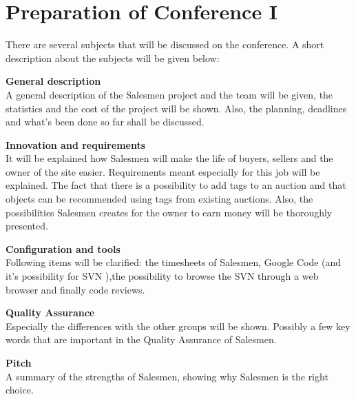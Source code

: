 \documentclass[a4paper, 12pt]{article}
\begin{document}
	\section{Preparation of Conference I}
There are several subjects that will be discussed on the conference. A short description about the subjects will be given below:
		\begin{description}
			\item \textbf{General description} \\
A general description of the Salesmen project and the team will be given, the statistics and the cost of the project will be shown. Also, the planning, deadlines and what's been done so far shall be discussed.
			\item \textbf{Innovation and requirements} \\
It will be explained how Salesmen will make the life of buyers, sellers and the owner of the site easier. Requirements meant especially for this job will be explained. The fact that there is a possibility to add tags to an auction and that objects can be recommended using tags from existing auctions. Also, the possibilities Salesmen creates for the owner to earn money will be thoroughly presented. 
			\item \textbf{Configuration and tools} \\
Following items will be clarified: the timesheets of Salesmen, Google Code (and it's possibility for SVN ),the possibility to browse the SVN through a web browser and finally code reviews.
			\item \textbf{Quality Assurance} \\
Especially the differences with the other groups will be shown. Possibly a few key words that are important in the Quality Assurance of Salesmen.
			\item \textbf{Pitch} \\
A summary of the strengths of Salesmen, showing why Salesmen is the right choice.
 	\end{description}
 	
\end{document}
